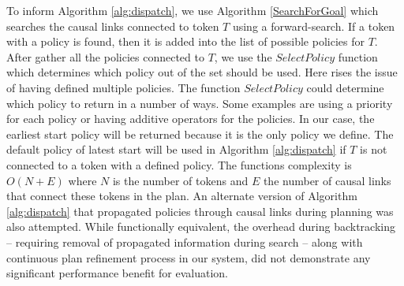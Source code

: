 
To inform Algorithm \ref{alg:dispatch}, we use Algorithm \ref{SearchForGoal} which
searches the causal links connected to token $T$ using a forward-search. 
If a token with a policy is found, then it is added into the list of possible policies for $T$. 
After gather all the policies connected to $T$, we use the $SelectPolicy$ function which
determines which policy out of the set should be used. Here rises the issue of having defined multiple policies.
The function $SelectPolicy$ could determine which policy to return in a number
of ways. Some examples are using a priority for each policy or having additive operators for the policies.
In our case, the earliest start policy will be returned because it is the only policy we define.
The default policy of latest start will be used in Algorithm \ref{alg:dispatch} 
if $T$ is not connected to a token with a defined policy. 
The functions complexity is $O(N+E)$ \cite{corman} where $N$ is the
number of tokens and $E$ the number of causal links that connect these
tokens in the plan. An alternate version of Algorithm
\ref{alg:dispatch} that propagated policies through causal links
during planning was also attempted. While functionally equivalent, the
overhead during backtracking -- requiring removal of propagated
information during search -- along with continuous plan refinement
process in our system, did not demonstrate any significant performance
benefit for evaluation.



